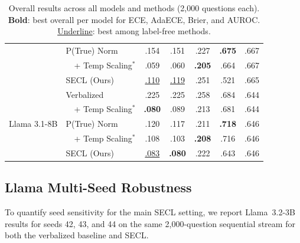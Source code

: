 \begin{table}[htbp]
\begin{tabular}{llccccc}
  & P(True) Norm        & .154 & .151 & .227 & \textbf{.675} & .667 \\
  & ~~+ Temp Scaling$^*$ & .059 & .060 & \textbf{.205} & .664 & .667 \\
  & SECL (Ours)         & \underline{.110} & \underline{.119} & .251 & .521 & .665 \\
\midrule
\multirow{5}{*}{Llama 3.1-8B}
  & Verbalized     & .225 & .225 & .258 & .684 & .644 \\
  & ~~+ Temp Scaling$^*$ & \textbf{.080} & .089 & .213 & .681 & .644 \\
  & P(True) Norm        & .120 & .117 & .211 & \textbf{.718} & .646 \\
  & ~~+ Temp Scaling$^*$ & .108 & .103 & \textbf{.208} & .716 & .646 \\
  & SECL (Ours)         & \underline{.083} & \textbf{.080} & .222 & .643 & .646 \\
\bottomrule
\end{tabular}
\vspace{0.3em}
\par{}
\par{}
\caption{Overall results across all models and methods (2{,}000 questions each).
\textbf{Bold}: best overall per model for ECE, AdaECE, Brier, and AUROC.
\underline{Underline}: best among label-free methods.}
\label{tab:main_results_full}
\end{table}

\subsection{Llama Multi-Seed Robustness} \label{app:llama_multiseed}

To quantify seed sensitivity for the main SECL setting, we report Llama~3.2-3B results for seeds 42, 43, and 44 on the same 2{,}000-question sequential stream for both the verbalized baseline and SECL.

